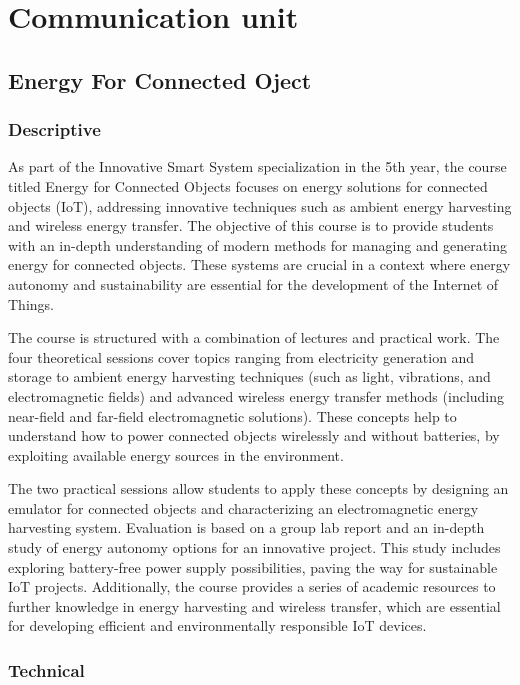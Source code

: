 \chapter{Communication unit}
\thispagestyle{fancy}


\section{Energy For Connected Oject}

\subsection{Descriptive}

As part of the Innovative Smart System specialization in the 5th year, the course titled Energy for Connected Objects focuses on energy solutions for connected objects (IoT), addressing innovative techniques such as ambient energy harvesting and wireless energy transfer. The objective of this course is to provide students with an in-depth understanding of modern methods for managing and generating energy for connected objects. These systems are crucial in a context where energy autonomy and sustainability are essential for the development of the Internet of Things.

The course is structured with a combination of lectures and practical work. The four theoretical sessions cover topics ranging from electricity generation and storage to ambient energy harvesting techniques (such as light, vibrations, and electromagnetic fields) and advanced wireless energy transfer methods (including near-field and far-field electromagnetic solutions). These concepts help to understand how to power connected objects wirelessly and without batteries, by exploiting available energy sources in the environment.

The two practical sessions allow students to apply these concepts by designing an emulator for connected objects and characterizing an electromagnetic energy harvesting system. Evaluation is based on a group lab report and an in-depth study of energy autonomy options for an innovative project. This study includes exploring battery-free power supply possibilities, paving the way for sustainable IoT projects. Additionally, the course provides a series of academic resources to further knowledge in energy harvesting and wireless transfer, which are essential for developing efficient and environmentally responsible IoT devices.


\subsection{Technical}

